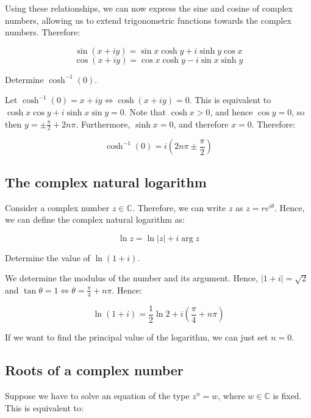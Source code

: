 \documentclass[12pt]{article}
\begin{document}
Using these relationships, we can now express the sine and cosine of complex numbers, allowing us to extend trigonometric functions towards the complex numbers. Therefore:

\[ \sin{(x + iy)} = \sin{x}\cosh{y} + i\sinh{y}\cos{x}\]
\[ \cos{(x + iy)} = \cos{x}\cosh{y} - i\sin{x}\sinh{y} \]

\begin{example}
    Determine $\cosh^{-1}(0).$

    Let $\cosh^{-1}(0) = x + iy \Leftrightarrow \cosh{(x + iy)} = 0$. This is equivalent to $\cosh{x}\cos{y} + i\sinh{x}\sin{y} = 0$. Note that $\cosh{x} > 0$, and hence $\cos{y} = 0$, so then $y = \pm \frac{\pi}{2} + 2n\pi$. Furthermore, $\sinh{x} = 0$, and therefore $x = 0$. Therefore:

    \[ \cosh^{-1}(0) = i(2n\pi \pm \frac{\pi}{2}) \]
\end{example}

\newpage

\subsection{The complex natural logarithm}

Consider a complex number $z \in \mathbb{C}$. Therefore, we can write $z$ as $z = re^{i\theta}$. Hence, we can define the complex natural logarithm as:

\[ \ln{z} = \ln{|z|} + i\arg{z} \]

\begin{example}
    Determine the value of $\ln{(1 + i)}$.

    We determine the modulus of the number and its argument. Hence, $|1 + i| = \sqrt{2}$ and $\tan{\theta} = 1 \Leftrightarrow \theta = \frac{\pi}{4} + n\pi$. Hence:

    \[ \ln{(1 + i)} = \frac{1}{2}\ln{2} + i(\frac{\pi}{4} + n\pi) \]

    If we want to find the principal value of the logarithm, we can just set $n = 0$.
\end{example}

\newpage

\subsection{Roots of a complex number}

Suppose we have to solve an equation of the type $z^n = w$, where $w \in \mathbb{C}$ is fixed. This is equivalent to:
\end{document}
